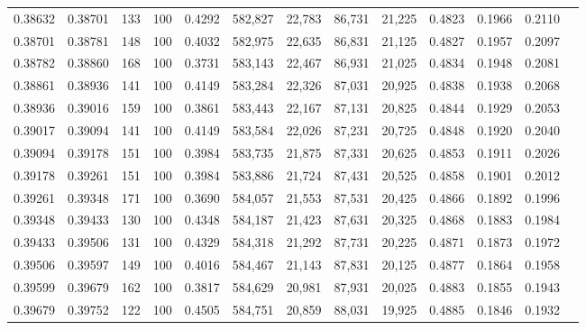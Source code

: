 \begin{tabular}{rrrrrrrrrrrrr}
0.38632 & 0.38701 &   133 & 100 &                                     0.4292 & 582,827 &  22,783 &  86,731 &  21,225 & 0.4823 & 0.1966 & 0.2110 \\
0.38701 & 0.38781 &   148 & 100 &                                     0.4032 & 582,975 &  22,635 &  86,831 &  21,125 & 0.4827 & 0.1957 & 0.2097 \\
0.38782 & 0.38860 &   168 & 100 &                                     0.3731 & 583,143 &  22,467 &  86,931 &  21,025 & 0.4834 & 0.1948 & 0.2081 \\
0.38861 & 0.38936 &   141 & 100 &                                     0.4149 & 583,284 &  22,326 &  87,031 &  20,925 & 0.4838 & 0.1938 & 0.2068 \\
0.38936 & 0.39016 &   159 & 100 &                                     0.3861 & 583,443 &  22,167 &  87,131 &  20,825 & 0.4844 & 0.1929 & 0.2053 \\
0.39017 & 0.39094 &   141 & 100 &                                     0.4149 & 583,584 &  22,026 &  87,231 &  20,725 & 0.4848 & 0.1920 & 0.2040 \\
0.39094 & 0.39178 &   151 & 100 &                                     0.3984 & 583,735 &  21,875 &  87,331 &  20,625 & 0.4853 & 0.1911 & 0.2026 \\
0.39178 & 0.39261 &   151 & 100 &                                     0.3984 & 583,886 &  21,724 &  87,431 &  20,525 & 0.4858 & 0.1901 & 0.2012 \\
0.39261 & 0.39348 &   171 & 100 &                                     0.3690 & 584,057 &  21,553 &  87,531 &  20,425 & 0.4866 & 0.1892 & 0.1996 \\
0.39348 & 0.39433 &   130 & 100 &                                     0.4348 & 584,187 &  21,423 &  87,631 &  20,325 & 0.4868 & 0.1883 & 0.1984 \\
0.39433 & 0.39506 &   131 & 100 &                                     0.4329 & 584,318 &  21,292 &  87,731 &  20,225 & 0.4871 & 0.1873 & 0.1972 \\
0.39506 & 0.39597 &   149 & 100 &                                     0.4016 & 584,467 &  21,143 &  87,831 &  20,125 & 0.4877 & 0.1864 & 0.1958 \\
0.39599 & 0.39679 &   162 & 100 &                                     0.3817 & 584,629 &  20,981 &  87,931 &  20,025 & 0.4883 & 0.1855 & 0.1943 \\
0.39679 & 0.39752 &   122 & 100 &                                     0.4505 & 584,751 &  20,859 &  88,031 &  19,925 & 0.4885 & 0.1846 & 0.1932 \\

\end{tabular}
